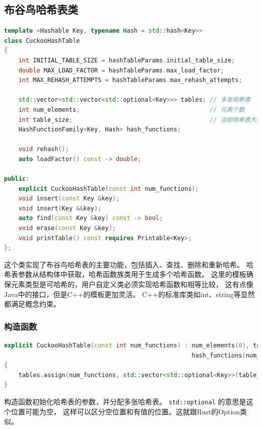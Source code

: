 \documentclass[UTF8]{ctexart}
\begin{document}
\subsection{布谷鸟哈希表类}
\begin{lstlisting}[language=C++]
template <Hashable Key, typename Hash = std::hash<Key>>
class CuckooHashTable
{
    int INITIAL_TABLE_SIZE = hashTableParams.initial_table_size;
    double MAX_LOAD_FACTOR = hashTableParams.max_load_factor;
    int MAX_REHASH_ATTEMPTS = hashTableParams.max_rehash_attempts;

    std::vector<std::vector<std::optional<Key>>> tables; // 多张哈希表
    int num_elements;                                    // 元素个数
    int table_size;                                      // 当前哈希表大小
    HashFunctionFamily<Key, Hash> hash_functions;

    void rehash();
    auto loadFactor() const -> double;

public:
    explicit CuckooHashTable(const int num_functions);
    void insert(const Key &key);
    void insert(Key &&key);
    auto find(const Key &key) const -> bool;
    void erase(const Key &key);
    void printTable() const requires Printable<Key>;
};
\end{lstlisting}
这个类实现了布谷鸟哈希表的主要功能，包括插入、查找、删除和重新哈希。
哈希表参数从结构体中获取，哈希函数族类用于生成多个哈希函数。
这里的模板确保元素类型是可哈希的，用户自定义类必须实现哈希函数和相等比较，
这有点像Java中的接口，但是C++的模板更加灵活。
C++的标准库类如int、string等显然都满足概念约束。

\subsubsection{构造函数}
\begin{lstlisting}[language=C++]
explicit CuckooHashTable(const int num_functions) : num_elements(0), table_size(INITIAL_TABLE_SIZE),
                                                    hash_functions(num_functions)
{
    tables.assign(num_functions, std::vector<std::optional<Key>>(table_size));
}
\end{lstlisting}
构造函数初始化哈希表的参数，并分配多张哈希表。
\texttt{std::optional} 的意思是这个位置可能为空，
这样可以区分空位置和有值的位置。这就跟Rust的Option类似。
\end{document}
